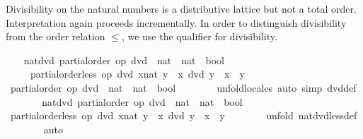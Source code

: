 \begin{isabellebody}
\begin{isamarkuptext}
  Divisibility on the natural numbers is a distributive lattice
  but not a total order.  Interpretation again proceeds
  incrementally.  In order to distinguish divisibility from the order
  relation $\le$, we use the qualifier  for
  divisibility.%
\end{isamarkuptext}%
\isamarkuptrue%
\ \ \isamarkupfalse%
\ nat{\isacharunderscore}dvd{\isacharcolon}\ partial{\isacharunderscore}order\ {\isachardoublequoteopen}op\ dvd\ {\isacharcolon}{\isacharcolon}\ nat\ {\isasymRightarrow}\ nat\ {\isasymRightarrow}\ bool{\isachardoublequoteclose}\isanewline
\ \ \ \ \ {\isachardoublequoteopen}partial{\isacharunderscore}order{\isachardot}less\ op\ dvd\ {\isacharparenleft}x{\isacharcolon}{\isacharcolon}nat{\isacharparenright}\ y\ {\isacharequal}\ {\isacharparenleft}x\ dvd\ y\ {\isasymand}\ x\ {\isasymnoteq}\ y{\isacharparenright}{\isachardoublequoteclose}\isanewline
%
\isadelimproof
\ \ %
\endisadelimproof
%
\isatagproof
{}\isamarkupfalse%
\ {\isacharminus}\isanewline
\ \ \ \ \isamarkupfalse%
\ {\isachardoublequoteopen}partial{\isacharunderscore}order\ {\isacharparenleft}op\ dvd\ {\isacharcolon}{\isacharcolon}\ nat\ {\isasymRightarrow}\ nat\ {\isasymRightarrow}\ bool{\isacharparenright}{\isachardoublequoteclose}\isanewline
\ \ \ \ \ \ \isamarkupfalse%
\ unfold{\isacharunderscore}locales\ {\isacharparenleft}auto\ simp{\isacharcolon}\ dvd{\isacharunderscore}def{\isacharparenright}\isanewline
\ \ \ \ \isamarkupfalse%
\ \isamarkupfalse%
\ nat{\isacharunderscore}dvd{\isacharcolon}\ partial{\isacharunderscore}order\ {\isachardoublequoteopen}op\ dvd\ {\isacharcolon}{\isacharcolon}\ nat\ {\isasymRightarrow}\ nat\ {\isasymRightarrow}\ bool{\isachardoublequoteclose}\ \isacommand{{\isachardot}}\isamarkupfalse%
\isanewline
\ \ \ \ \isamarkupfalse%
\ {\isachardoublequoteopen}partial{\isacharunderscore}order{\isachardot}less\ op\ dvd\ {\isacharparenleft}x{\isacharcolon}{\isacharcolon}nat{\isacharparenright}\ y\ {\isacharequal}\ {\isacharparenleft}x\ dvd\ y\ {\isasymand}\ x\ {\isasymnoteq}\ y{\isacharparenright}{\isachardoublequoteclose}\isanewline
\ \ \ \ \ \ \isamarkupfalse%
\ {\isacharparenleft}unfold\ nat{\isacharunderscore}dvd{\isachardot}less{\isacharunderscore}def{\isacharparenright}\isanewline
\ \ \ \ \ \ \isamarkupfalse%
\ auto\isanewline
\ \ \ \ \ \ \isamarkupfalse%
\isanewline
\ \ \isamarkupfalse%

\end{isabellebody}
